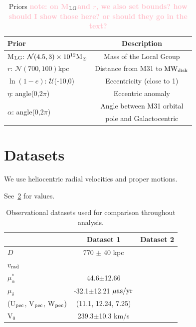 \documentclass[twocolumn]{aastex631}
\newcommand{\mlg}{M$_{\rm LG}$}
\newcommand{\kc}[1]{\textcolor{pink}{\textbf{#1}} }
\newcommand{\mwdisk}{\rm MW_{disk}}
\begin{document}
\begin{table}
  \centering
  \begin{tabular}{lc}
  \hline\hline
  Prior  & Description \\\hline
  \mlg: $\mathcal{N}(4.5,3)\times10^{12}\mathrm{M}_\odot$ & Mass of the Local Group\\
  $r$: $\mathcal{N}(700,100)$kpc & Distance from M31 to $\mwdisk$\\
  $\ln(1-e)$: $\mathcal{U}$(-10,0) & Eccentricity (close to 1) \\
  $\eta$: angle(0,2$\pi$)& Eccentric anomaly\\
  \multirow{2}{*}{$\alpha$: angle(0,2$\pi$)} & Angle between M31 orbital\\
  & pole and Galactocentric\\
  \hline\hline
  \end{tabular}
  \caption{\label{table:priors}Priors \kc{note: on \mlg and $r$, we also set bounds? how should I show those here? or should they go in the text?}}
\end{table}




\section{Datasets}
We use heliocentric radial velocities and proper motions. 

See~\ref{table:data} for values.
\begin{table}
  \centering
  \begin{tabular}{lc|c}
    \hline\hline
                    & Dataset 1                     & Dataset 2 \\\hline
  $D$               &  770 $\pm$ 40 \rm kpc\cite{}     &           \\
  $v_{\rm rad}$     &           &           \\
  $\mu_\alpha^*$    & 44.6$\pm$12.66\cite{} \\
  $\mu_\delta$      & -32.1$\pm$12.21 $\mu\rm as/yr$ & \\
  (U$_{\rm pec}$, V$_{\rm pec}$, W$_{\rm pec}$) & (11.1, 12.24, 7.25)& \\
  V$_0$             & 239.3$\pm$10.3 km/s & \\
  \hline\hline
  
  \end{tabular}
  \caption{\label{table:data}Observational datasets used for comparison throughout analysis.}
\end{table}
\end{document}
